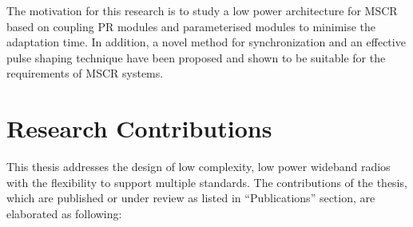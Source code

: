 The motivation for this research is to study a low power architecture for MSCR based on coupling PR modules and parameterised modules to minimise the adaptation time. 
In addition, a novel method for synchronization and an effective pulse shaping technique have been proposed and shown to be suitable for the requirements of MSCR systems.
\section{Research Contributions}

This thesis addresses the design of low complexity, low power wideband radios with the flexibility to support multiple standards. 
The contributions of the thesis, which are published or under review as listed in  ``Publications'' section, are elaborated as following:
